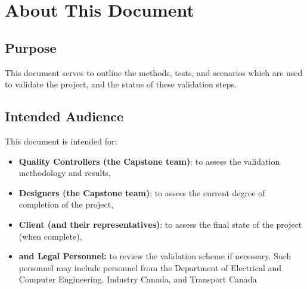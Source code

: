 \documentclass[10pt,letterpaper]{article}
\begin{document}
\begin{titlepage}
	\maketitle
\end{titlepage}

% 







\thispagestyle{empty}
\listoffigures
\listoftables
\newpage

\setcounter{page}{1}


\section{About This Document}

\subsection{Purpose}
This document serves to outline the methods, tests, and scenarios which are used to validate the project, and the status of these validation steps. 

\subsection{Intended Audience}
This document is intended for:
\begin{itemize}
\item \textbf{Quality Controllers (the Capstone team)}: to assess the validation methodology and results,
\item \textbf{Designers (the Capstone team)}: to assess the current degree of completion of the project,
\item \textbf{Client (and their representatives)}: to assess the final state of the project (when complete),
\item \textbf{and Legal Personnel:} to review the validation scheme if necessary. Such personnel may include personnel from the Department of Electrical and Computer Engineering, Industry Canada, and Transport Canada
\end{itemize}
\end{document}
